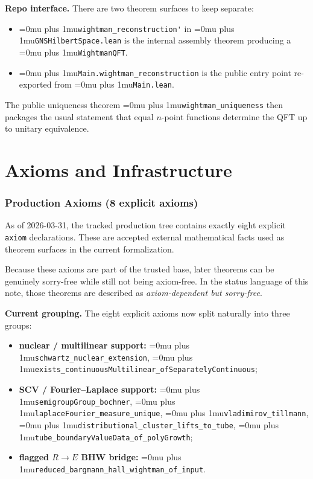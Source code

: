 \documentclass[11pt,a4paper]{article}
\newcommand{\leanfile}[1]{\begingroup\Urlmuskip=0mu plus 1mu\relax\nolinkurl{#1}\endgroup}
\newcommand{\leanname}[1]{\begingroup\Urlmuskip=0mu plus 1mu\relax\nolinkurl{#1}\endgroup}
\begin{document}
\medskip\noindent
\textbf{Repo interface.}
There are two theorem surfaces to keep separate:
\begin{itemize}
\item \leanname{wightman\_reconstruction'} in \leanfile{GNSHilbertSpace.lean}
  is the internal assembly theorem producing a \leanname{WightmanQFT}.
\item \leanname{Main.wightman\_reconstruction} is the public entry point
  re-exported from \leanfile{Main.lean}.
\end{itemize}

\noindent
The public uniqueness theorem \leanname{wightman\_uniqueness} then packages the
usual statement that equal $n$-point functions determine the QFT up to unitary
equivalence.


\part{Axioms and Infrastructure}

\section{Production Axioms (8 explicit axioms)}

As of 2026-03-31, the tracked production tree contains exactly eight explicit
\texttt{axiom} declarations. These are accepted external mathematical facts
used as theorem surfaces in the current formalization.

\medskip\noindent
Because these axioms are part of the trusted base, later theorems can be
genuinely sorry-free while still not being axiom-free. In the status language of
this note, those theorems are described as \emph{axiom-dependent but
sorry-free}.

\medskip\noindent
\textbf{Current grouping.}
The eight explicit axioms now split naturally into three groups:
\begin{itemize}
\item \textbf{nuclear / multilinear support:}
  \leanname{schwartz\_nuclear\_extension},
  \leanname{exists\_continuousMultilinear\_ofSeparatelyContinuous};
\item \textbf{SCV / Fourier--Laplace support:}
  \leanname{semigroupGroup\_bochner},
  \leanname{laplaceFourier\_measure\_unique},
  \leanname{vladimirov\_tillmann},
  \leanname{distributional\_cluster\_lifts\_to\_tube},
  \leanname{tube\_boundaryValueData\_of\_polyGrowth};
\item \textbf{flagged $R \to E$ BHW bridge:}
  \leanname{reduced\_bargmann\_hall\_wightman\_of\_input}.
\end{itemize}
\end{document}

